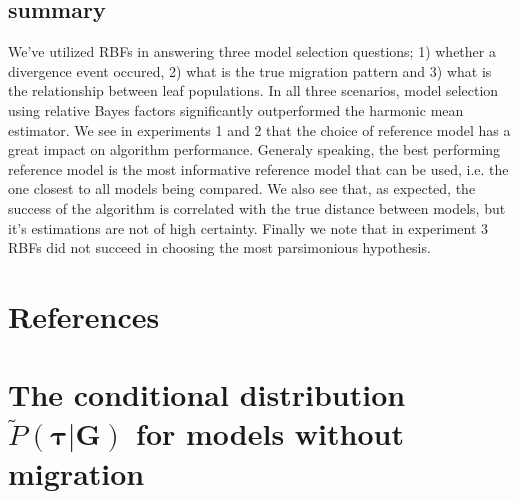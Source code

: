 \documentclass[11pt]{article}
\newcommand{\vect}[1]{\boldsymbol{\mathbf{#1}}}
\newcommand{\Tr}{\mathcal{T}}
\newcommand{\G}{\vect{G}}
\newcommand{\Pref}{\widetilde{P}}
\newcommand{\1}{\mathbbm{1}}
\newcommand{\taus}{\vect\tau}
\begin{document}
\subsection{summary}

We've utilized RBFs in answering three model selection questions; 1) whether a divergence event occured, 2) what is the true migration pattern and 3) what is the relationship between leaf populations. In all three scenarios, model selection using relative Bayes factors significantly outperformed the harmonic mean estimator.
%
We see in experiments 1 and 2 that the choice of reference model has a great impact on algorithm performance. Generaly speaking, the best performing reference model is the most informative reference model that can be used, i.e. the one closest to all models being compared. 
%
We also see that, as expected, the success of the algorithm is correlated with the true distance between models, but it's estimations are not of high certainty.
%
Finally we note that in experiment 3 RBFs did not succeed in choosing the most parsimonious hypothesis.


\newpage

\newpage

\section{References}
\renewcommand*{\refname}{ }





\newpage


\appendix
\newcommand{\anc}{\geq_\Tr}
\newcommand{\nanc}{\ngeq_\Tr}

\section{\texorpdfstring{The conditional distribution $\Pref(\taus|\G)$ for models without migration}{Conditional distribution without migration}}\label{ap:cond_nomig}
\end{document}
